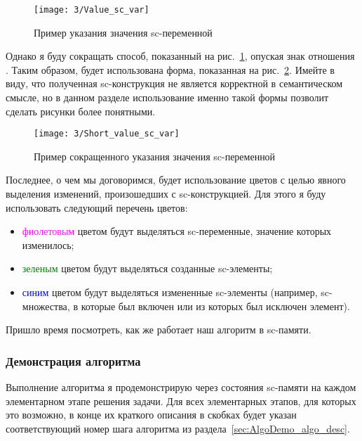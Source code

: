 \begin{figure}[h!]
  \centering
  \texttt{[image: 3/Value\_sc\_var]}
  \caption{Пример указания значения sc-переменной }
  \label{fig:Value_sc_var}
\end{figure}

Однако я буду сокращать способ, показанный на
рис.~\ref{fig:Value_sc_var}, опуская знак отношения
. Таким образом, будет использована форма, показанная на
рис.~\ref{fig:Short_value_sc_var}. Имейте в виду, что полученная
sc-конструкция не является корректной в семантическом смысле, но в
данном разделе использование именно такой формы позволит сделать
рисунки более понятными.

\begin{figure}[h!]
  \centering
  \texttt{[image: 3/Short\_value\_sc\_var]}
  \caption{Пример сокращенного указания значения sc-переменной
    }
  \label{fig:Short_value_sc_var}
\end{figure}

Последнее, о чем мы договоримся, будет использование цветов с целью
явного выделения изменений, произошедших с sc-конструкцией. Для этого
я буду использовать следующий перечень цветов:

\begin{itemize}
\item \textcolor{magenta}{фиолетовым} цветом будут выделяться sc-переменные, значение
  которых изменилось;
\item \textcolor{green}{зеленым} цветом будут выделяться созданные sc-элементы;
\item \textcolor{blue}{синим} цветом будут выделяться измененные sc-элементы (например,
  sc-множества, в которые был включен или из которых был исключен
  элемент).
\end{itemize}

Пришло время посмотреть, как же работает наш алгоритм в sc-памяти.

\subsubsection{Демонстрация алгоритма}
\label{sec:AlgoDemo_demo}

Выполнение алгоритма я продемонстрирую через состояния sc-памяти на
каждом элементарном этапе решения задачи. Для всех элементарных
этапов, для которых это возможно, в конце их краткого описания в
скобках будет указан соответствующий номер шага алгоритма из
раздела~\ref{sec:AlgoDemo_algo_desc}.

